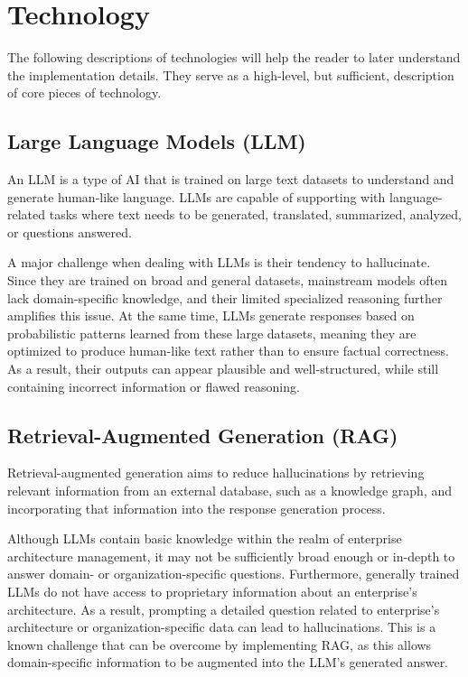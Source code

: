 \section{Technology}
\label{sec:background:technology}
The following descriptions of technologies will help the reader to later understand the implementation details. They serve as a high-level, but sufficient, description of core pieces of technology.

\subsection{Large Language Models (LLM)}
\label{sub:background:llms}
An LLM is a type of AI that is trained on large text datasets to understand and generate human-like language.  LLMs are capable of supporting with language-related tasks where text needs to be generated, translated, summarized, analyzed, or questions answered. \cite{hadi2023large}

A major challenge when dealing with LLMs is their tendency to hallucinate. Since they are trained on broad and general datasets, mainstream models often lack domain-specific knowledge, and their limited specialized reasoning further amplifies this issue. At the same time, LLMs generate responses based on probabilistic patterns learned from these large datasets, meaning they are optimized to produce human-like text rather than to ensure factual correctness. As a result, their outputs can appear plausible and well-structured, while still containing incorrect information or flawed reasoning. \cite{wan2025prompting, hicks2024chatgpt}


\subsection{Retrieval-Augmented Generation (RAG)}
\label{sub:background:rag}
Retrieval-augmented generation aims to reduce hallucinations by retrieving relevant information from an external database, such as a knowledge graph, and incorporating that information into the response generation process. \cite{zhao2026retrieval, lewis2020retrieval}

Although LLMs contain basic knowledge within the realm of enterprise architecture management, it may not be sufficiently broad enough or in-depth to  answer domain- or organization-specific questions. Furthermore, generally trained LLMs do not have access to proprietary information about an enterprise's architecture. As a result, prompting a detailed question related to enterprise's architecture or organization-specific data can lead to hallucinations. \cite{lewis2020retrieval} This is a known challenge that can be overcome by implementing RAG, as this allows domain-specific information to be augmented into the LLM's generated answer.

